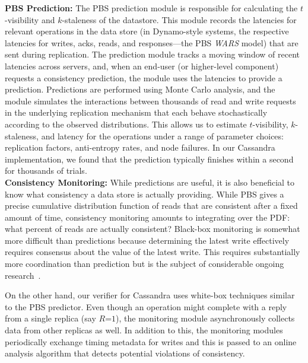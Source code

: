 \textbf{PBS Prediction:} The PBS prediction module is responsible for
calculating the $t$-visibility and $k$-staleness of the
datastore. This module records the latencies for relevant operations
in the data store (in Dynamo-style systems, the respective latencies
for writes, acks, reads, and responses---the PBS \textit{WARS} model)
that are sent during replication.  The prediction module tracks a
moving window of recent latencies across servers, and, when an
end-user (or higher-level component) requests a consistency
prediction, the module uses the latencies to provide a
prediction. Predictions are performed using Monte Carlo analysis, and
the module simulates the interactions between thousands of read and
write requests in the underlying replication mechanism that each
behave stochastically according to the observed distributions. This
allows us to estimate $t$-visibility, $k$-staleness, and latency for
the operations under a range of parameter choices: replication
factors, anti-entropy rates, and node failures. In our Cassandra
implementation, we found that the prediction typically finishes within
a second for thousands of trials.\\



\textbf{Consistency Monitoring:} While predictions are useful, it is
also beneficial to know what consistency a data store is actually providing.
While PBS gives a precise cumulative distribution function of reads that are
consistent after a fixed amount of time, consistency monitoring amounts to
integrating over the PDF: what percent of reads are actually consistent?
Black-box monitoring is somewhat more difficult than predictions because
determining the latest write effectively requires consensus about the value of
the latest write. This requires substantially more coordination than prediction
but is the subject of considerable ongoing research~\cite{hotdep}. 

On the other hand, our verifier for Cassandra uses white-box techniques similar
to the PBS predictor. Even though an operation might complete with a reply
from a single replica (say $R$=$1$), the monitoring module asynchronously collects 
data from other replicas as well. In addition to this, the monitoring modules
periodically exchange timing metadata for writes and this is passed to an online
analysis algorithm that detects potential violations of consistency.


